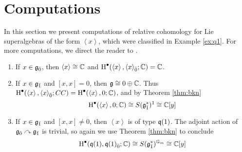 \section{Computations}
\label{sec:compute-H*}

In this section we present computations of relative cohomology for Lie superalgebras of the form $\left< x\right>$, which were classified in Example \ref{ex:q1}. For more computations, we direct the reader to \cite[Table 1]{BKN-1}.

\begin{example}
  \begin{enumerate}
  \item If $x \in {\mathfrak{g}}_{\bar{0}}$, then $\left<x\right> \cong \mathbb{C}$ and $\operatorname{H}^\bullet(\left<x\right>, {\left<x\right>}_{\bar{0}} ; \mathbb{C}) = \mathbb{C}$.
  \item If $x \in {\mathfrak{g}}_{\bar{1}}$ and $[x,x] =0$, then $\mathfrak{g} \cong 0 \oplus \mathbb{C}$. Thus $\operatorname{H}^\bullet(\left<x\right>,{\left<x\right>}_{\bar{0}};CC) = \operatorname{H}^\bullet(\left<x\right>,0;\mathbb{C})$, and by Theorem \ref{thm:bkn}
    \begin{equation}
      \label{eq:odd-ab-cohom}
      \operatorname{H}^\bullet(\left<x\right>,0;\mathbb{C}) \cong S({\mathfrak{g}}_{\bar{1}}^*)^{1} \cong \mathbb{C}[y]
    \end{equation}
  \item If $x \in {\mathfrak{g}}_{\bar{1}}$ and $[x,x] \neq 0$, then $\left<x\right>$ is of type $\mathfrak{q}(1)$. The adjoint action of ${\mathfrak{g}}_{\bar{0}} \curvearrowright {\mathfrak{g}}_{\bar{1}}$ is trivial, so again we use Theorem \ref{thm:bkn} to conclude
    \begin{equation}
      \label{eq:q(1)-cohom}
      \operatorname{H}^\bullet(\mathfrak{q}(1),{\mathfrak{q}(1)}_{\bar{0}};\mathbb{C}) \cong S({\mathfrak{g}}_{\bar{1}}^*)^{\mathbb{G}_m} \cong \mathbb{C}[y]
    \end{equation}
  \end{enumerate}
\end{example}



